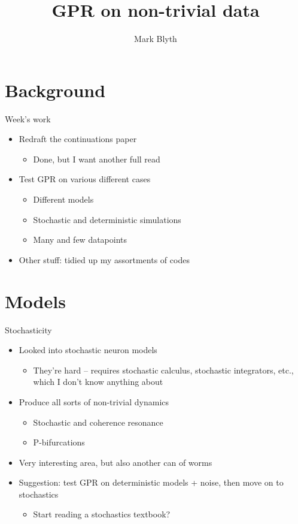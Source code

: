 \documentclass[presentation]{beamer}
\author{Mark Blyth}
\date{}
\title{GPR on non-trivial data}
\begin{document}
\maketitle

\section{Background}
\label{sec:org56b3de2}
\begin{frame}[label={sec:org8056e5e}]{Week's work}
\begin{itemize}
\item Redraft the continuations paper
\begin{itemize}
\item Done, but I want another full read
\end{itemize}
\item Test GPR on various different cases
\begin{itemize}
\item Different models
\item Stochastic and deterministic simulations
\item Many and few datapoints
\end{itemize}
\item Other stuff: tidied up my assortments of codes
\end{itemize}
\end{frame}

\section{Models}
\label{sec:org87f1c14}
\begin{frame}[label={sec:orgab5deeb}]{Stochasticity}
\begin{itemize}
\item Looked into stochastic neuron models
\begin{itemize}
\item They're hard -- requires stochastic calculus, stochastic integrators, etc., which I don't know anything about
\end{itemize}
\item Produce all sorts of non-trivial dynamics
\begin{itemize}
\item Stochastic and coherence resonance
\item P-bifurcations
\end{itemize}
\end{itemize}

\vfill

\begin{itemize}
\item Very interesting area, but also another can of worms
\item Suggestion: test GPR on deterministic models + noise, then move on to stochastics
\begin{itemize}
\item Start reading a stochastics textbook?
\end{itemize}
\end{itemize}
\end{frame}
\end{document}
